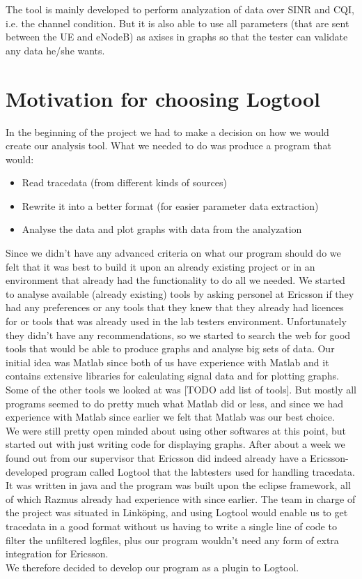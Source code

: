 \documentclass[cropmarks, frame, english]{idamasterthesis}
\begin{document}
The tool is mainly developed to perform analyzation of data over SINR and CQI, i.e. the channel condition. But it is also able to use all parameters (that are sent between the UE and eNodeB) as axises in graphs so that the tester can validate any data he/she wants.

\section{Motivation for choosing Logtool}
In the beginning of the project we had to make a decision on how we would create our analysis tool.
What we needed to do was produce a program that would:
\begin{itemize}
\item Read tracedata (from different kinds of sources)
\item Rewrite it into a better format (for easier parameter data extraction)
\item  Analyse the data and plot graphs with data from the analyzation
\end{itemize} 
Since we didn't have any advanced criteria on what our program should do we felt that it was best to build it upon an already existing project or in an environment that already had the functionality to do all we needed. \newline
We started to analyse available (already existing) tools by asking personel at Ericsson if they had any preferences or any tools that they knew that they already had licences for or tools that was already used in the lab testers environment. Unfortunately they didn't have any recommendations, so we started to search the web for good tools that would be able to produce graphs and analyse big sets of data. Our initial idea was Matlab since both of us have experience with Matlab and it contains extensive libraries for calculating signal data and for plotting graphs. Some of the other tools we looked at was [TODO add list of tools]. But mostly all programs seemed to do pretty much what Matlab did or less, and since we had experience with Matlab since earlier we felt that Matlab was our best choice. \\
We were still pretty open minded about using other softwares at this point, but started out with just writing code for displaying graphs. After about a week we found out from our supervisor that Ericsson did indeed already have a Ericsson-developed program called Logtool that the labtesters used for handling tracedata. It was written in java and the program was built upon the eclipse framework, all of which Razmus already had experience with since earlier. The team in charge of the project was situated in Linköping, and using Logtool would enable us to get tracedata in a good format without us having to write a single line of code to filter the unfiltered logfiles, plus our program wouldn't need any form of extra integration for Ericsson.\\
We therefore decided to develop our program as a plugin to Logtool. 
\end{document}
